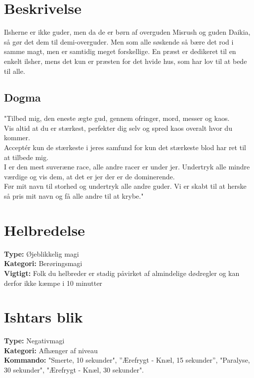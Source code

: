 \section{Beskrivelse}
Ilsherne er ikke guder, men da de er børn af overguden Misrush og guden Daikia, så gør det dem til demi-overguder. Men som alle søskende så bære det rod i samme magt, men er samtidig meget forskellige. En præst er dedikeret til en enkelt ilsher, mens det kun er præsten for det hvide hus, som har lov til at bede til alle.\\
\subsection{Dogma}
"Tilbed mig, den eneste ægte gud, gennem ofringer, mord, messer og kaos.\\
Vis altid at du er stærkest, perfekter dig selv og spred kaos overalt hvor du kommer.\\
Acceptér kun de stærkeste i jeres samfund for kun det stærkeste blod har ret til at tilbede mig.\\
I er den mest suveræne race, alle andre racer er under jer. Undertryk alle mindre værdige og vis dem, at det er jer der er de dominerende.\\
Før mit navn til storhed og undertryk alle andre guder. Vi er skabt til at herske så pris mit navn og få alle andre til at krybe."

\section{Helbredelse}
\textbf{Type:} Øjeblikkelig magi \\
\textbf{Kategori:} Berøringsmagi\\
\textbf{Vigtigt:} Folk du helbreder er stadig påvirket af almindelige dødregler og kan derfor ikke kæmpe i 10 minutter


\section{Ishtars blik}
\textbf{Type:} Negativmagi\\
\textbf{Kategori:} Afhænger af niveau\\
\textbf{Kommando:} "Smerte, 10 sekunder", ”Ærefrygt - Knæl, 15 sekunder”, "Paralyse, 30 sekunder", "Ærefrygt - Knæl, 30 sekunder".


